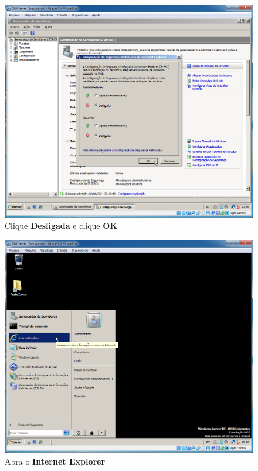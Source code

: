 \documentclass[10pt]{article}
\begin{document}
\begin{figure}[H]
    \centering
    \caption{Clique \textbf{Desligada} e clique \textbf{OK}}
    \label{fig:re038}
    \includegraphics[width=\linewidth]{images/rede_externa/re038.png}
\end{figure}
\begin{figure}[H]
    \centering
    \caption{Abra o \textbf{Internet Explorer}}
    \label{fig:re039}
    \includegraphics[width=\linewidth]{images/rede_externa/re039.png}
\end{figure}
\end{document}
